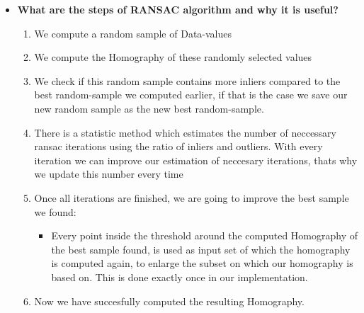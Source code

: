 \documentclass[12pt]{article}
\begin{document}
\begin{enumerate}[a)]
\begin{itemize}
     	\item
     	\textbf{What are the steps of RANSAC algorithm and why it is useful?}\\
        \begin{enumerate}[1)]
            \item 
                We compute a random sample of Data-values
            \item
                We compute the Homography of these randomly selected values
            \item
                We check if this random sample contains more inliers compared to the best random-sample we computed earlier, if that is the case we save our new random sample as the new best random-sample.
            \item
                There is a statistic method which estimates the number of neccessary ransac iterations using the ratio of inliers and outliers. With every iteration we can improve our estimation of neccesary iterations, thats why we update this number every time
            \item 
                Once all iterations are finished, we are going to improve the best sample we found:
                \begin{itemize}
                    \item 
                        Every point inside the threshold around the computed Homography of the best sample found, is used as input set of which the homography is computed again, to enlarge the subset on which our homography is based on. This is done exactly once in our implementation.
                \end{itemize}
            \item
                Now we have succesfully computed the resulting Homography.
        \end{enumerate}

     \end{itemize}
\end{enumerate}
\end{document}
